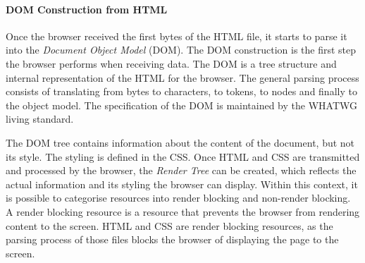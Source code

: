 


\paragraph{DOM Construction from HTML}


Once the browser received the first bytes of the HTML file, it starts to parse it into the \textit{Document Object Model} (DOM).
The DOM construction is the first step the browser performs when receiving data.
The DOM is a tree structure and internal representation of the HTML for the browser. %
The general parsing process consists of translating from bytes to characters, to tokens, to nodes and finally to the object model.%
The specification of the DOM is maintained by the WHATWG living standard. %




The DOM tree contains information about the content of the document, but not its style.
The styling is defined in the CSS.
Once HTML and CSS are transmitted and processed by the browser, the \textit{Render Tree} can be created, which reflects the actual information and its styling the browser can display.
Within this context, it is possible to categorise resources into render blocking and non-render blocking.
A render blocking resource is a resource that prevents the browser from rendering content to the screen.
HTML and CSS are render blocking resources, as the parsing process of those files blocks the browser of displaying the page to the screen.%

